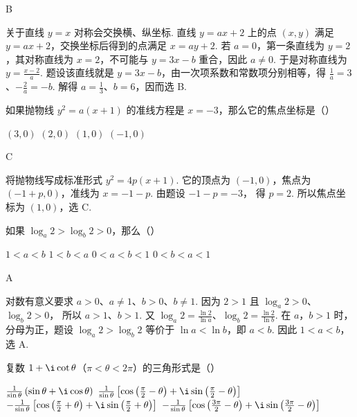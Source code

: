 \documentclass[UTF8,a4paper,oneside,11pt]{ctexbook}
\begin{document}
\begin{answer}
B
\end{answer}

\begin{solution}
关于直线 \(y=x\) 对称会交换横、纵坐标. 直线 \(y=ax+2\) 上的点 \((x,y)\) 满足 \(y=ax+2\)，交换坐标后得到的点满足
\(x=ay+2\).
若 \(a=0\)，第一条直线为 \(y=2\)，其对称直线为 \(x=2\)，不可能与 \(y=3x-b\) 重合，因此 \(a\ne0\). 于是对称直线为 \(y=\frac{x-2}{a}\). 题设该直线就是 \(y=3x-b\)，由一次项系数和常数项分别相等，得 \(\frac{1}{a}=3\)、\(-\frac{2}{a}=-b\).
解得 \(a=\frac{1}{3}\)、\(b=6\)，因而选 B.
\end{solution}

\begin{problem}
如果抛物线 \(y^2=a(x+1)\) 的准线方程是 \(x=-3\)，那么它的焦点坐标是（\quad）

\choices
    {\((3,0)\)}
    {\((2,0)\)}
    {\((1,0)\)}
    {\((-1,0)\)}
\end{problem}

\begin{answer}
C
\end{answer}

\begin{solution}
将抛物线写成标准形式
\(y^2=4p(x+1)\).
它的顶点为 \((-1,0)\)，焦点为 \((-1+p,0)\)，准线为 \(x=-1-p\). 由题设
\(-1-p=-3\)，
得 \(p=2\). 所以焦点坐标为 \((1,0)\)，选 C.
\end{solution}

\begin{problem}
如果 \(\log_{a} 2 > \log_{b} 2 > 0 \)，那么（\quad）

\choices
    {\(1<a<b\)}
    {\(1<b<a\)}
    {\(0<a<b<1\)}
    {\(0<b<a<1\)}
\end{problem}

\begin{answer}
A
\end{answer}

\begin{solution}
对数有意义要求 \(a>0\)、\(a\ne1\)、\(b>0\)、\(b\ne1\). 因为 \(2>1\) 且
\(\log_a2>0\)、\(\log_b2>0\)，
所以 \(a>1\)、\(b>1\). 又
\(\log_a2=\frac{\ln2}{\ln a}\)、\(\log_b2=\frac{\ln2}{\ln b}\).
在 \(a\)，\(b>1\) 时，分母为正，题设 \(\log_a2>\log_b2\) 等价于 \(\ln a<\ln b\)，即 \(a<b\). 因此 \(1<a<b\)，选 A.
\end{solution}

\begin{problem}
复数 \(1+\i\cot\theta\)（\(\pi<\theta<2\pi\)）的三角形式是（\quad）

\choices
    {\(\frac{1}{\sin\theta}\left( \sin\theta+\i\cos\theta \right)\)}
    {\(\frac{1}{\sin\theta}\left[ \cos\left( \frac{\pi}{2}-\theta \right)+\i\sin\left( \frac{\pi}{2}-\theta \right) \right]\)}
    {\(-\frac{1}{\sin\theta}\left[ \cos\left( \frac{\pi}{2}+\theta \right)+\i\sin\left( \frac{\pi}{2}+\theta \right) \right]\)}
    {\(-\frac{1}{\sin\theta}\left[ \cos\left( \frac{3\pi}{2}-\theta \right)+\i\sin\left( \frac{3\pi}{2}-\theta \right) \right]\)}
\end{problem}
\end{document}
